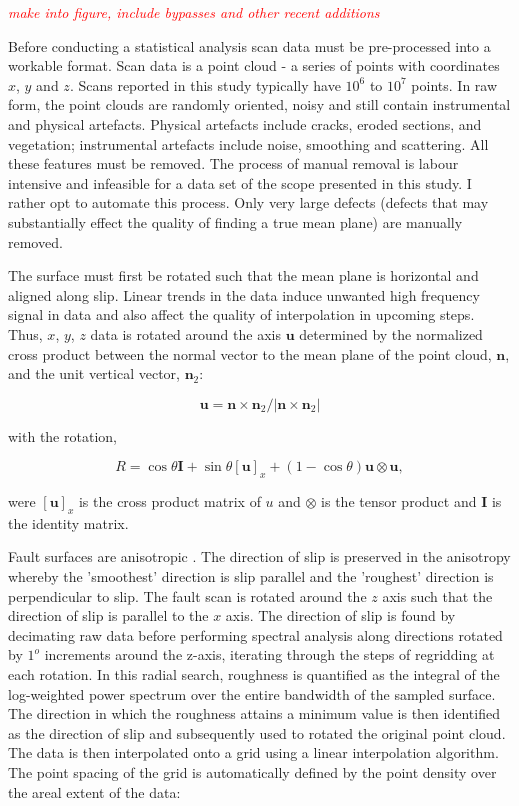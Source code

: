 \documentclass[12pt,a4paper]{article}
\begin{document}
\textcolor{red}{\textit{make into figure, include bypasses and other recent additions}}  
	 
	Before conducting a statistical analysis scan data must be pre-processed into a workable format. Scan data is a point cloud - a series of points with coordinates $x$, $y$ and $z$. Scans reported in this study typically have $10^6$ to $ 10^7$ points. In raw form, the point clouds are randomly oriented, noisy and still contain instrumental and physical artefacts. Physical artefacts include cracks, eroded sections, and vegetation; instrumental artefacts include noise, smoothing and scattering. All these features must be removed. The process of manual removal is labour intensive and infeasible for a data set of the scope presented in this study. I rather opt to automate this process. Only very large defects (defects that may substantially effect the quality of finding a true mean plane) are manually removed.

The surface must first be rotated such that the mean plane is horizontal and aligned along slip. Linear trends in the data induce unwanted high frequency signal in data and also affect the quality of interpolation in upcoming steps. Thus, $x$, $y$, $z$ data is rotated around the axis $\textbf{u}$ determined by the normalized cross product between the normal vector to the mean plane of the point cloud, $\textbf{n}$, and the unit vertical vector, $\textbf{n}_2$: 

$$ \textbf{u} = {\textbf{n}\times\textbf{n}_2}/{|{\textbf{n}\times\textbf{n}_2}|} $$

with the rotation,

$$ R = \cos\theta\textbf{I} + \sin\theta[\textbf{u}]_x+(1-\cos\theta)\textbf{u}\otimes\textbf{u},$$

were $[\textbf{u}]_x$ is the cross product matrix of $u$ and $\otimes$ is the tensor product and $\textbf{I}$ is the identity matrix. 

Fault surfaces are anisotropic \cite{lee1996structural}. The direction of slip is preserved in the anisotropy whereby the 'smoothest' direction is slip parallel and the 'roughest' direction is perpendicular to slip. The fault scan is rotated around the $z$ axis such that the direction of slip is parallel to the $x$ axis. The direction of slip is found by decimating raw data before performing spectral analysis along directions rotated by $1^o$ increments around the z-axis, iterating through the steps of regridding at each rotation. In this radial search, roughness is quantified as the integral of the log-weighted power spectrum over the entire bandwidth of the sampled surface. The direction in which the roughness attains a minimum value is then identified as the direction of slip and subsequently used to rotated the original point cloud. The data is then interpolated onto a grid using a linear interpolation algorithm. The point spacing of the grid is automatically defined by the point density over the areal extent of the data:
\end{document}
